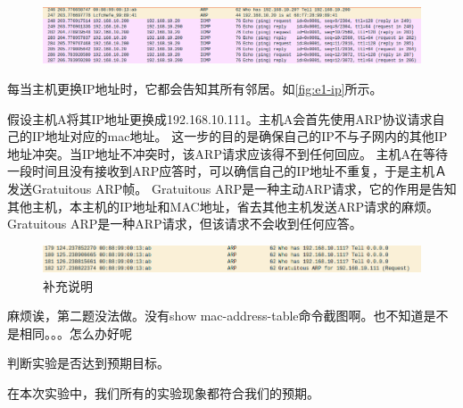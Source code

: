 \documentclass{myreport}
\begin{document}
\begin{figure}[htp]
    \centering
    \includegraphics[width=13cm]{"./figure/ws01.png"}
    \caption{}
    \label{fig:e1-ip}
\end{figure}


每当主机更换IP地址时，它都会告知其所有邻居。如\autoref{fig:e1-ip}所示。

假设主机A将其IP地址更换成192.168.10.111。主机A会首先使用ARP协议请求自己的IP地址对应的mac地址。
这一步的目的是确保自己的IP不与子网内的其他IP地址冲突。当IP地址不冲突时，该ARP请求应该得不到任何回应。
主机A在等待一段时间且没有接收到ARP应答时，可以确信自己的IP地址不重复，于是主机Ａ发送Gratuitous ARP帧。
Gratuitous ARP是一种主动ARP请求，它的作用是告知其他主机，本主机的IP地址和MAC地址，省去其他主机发送ARP请求的麻烦。
Gratuitous ARP是一种ARP请求，但该请求不会收到任何应答。

\begin{figure}[htp]
    \centering
    \includegraphics[width=13cm]{"./figure/ws02.png"}
    \caption{补充说明}
    \label{fig:e1-arp}
\end{figure}


麻烦诶，第二题没法做。没有show mac-address-table命令截图啊。也不知道是不是相同。。。怎么办好呢



\begin{tcolorbox}[title = {观察五}]
判断实验是否达到预期目标。
\end{tcolorbox}
在本次实验中，我们所有的实验现象都符合我们的预期。\\ 
\end{document}
